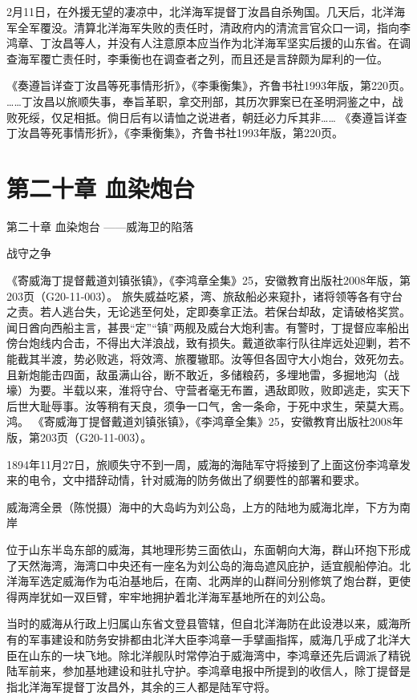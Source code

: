 \documentclass[12pt,UTF8]{ctexbook}
\begin{document}
2月11日，在外援无望的凄凉中，北洋海军提督丁汝昌自杀殉国。几天后，北洋海军全军覆没。清算北洋海军失败的责任时，清政府内的清流言官众口一词，指向李鸿章、丁汝昌等人，并没有人注意原本应当作为北洋海军坚实后援的山东省。在调查海军覆亡责任时，李秉衡也在调查者之列，而且还是言辞颇为犀利的一位。

《奏遵旨详查丁汝昌等死事情形折》，《李秉衡集》，齐鲁书社1993年版，第220页。
……丁汝昌以旅顺失事，奉旨革职，拿交刑部，其历次罪案已在圣明洞鉴之中，战败死绥，仅足相抵。倘日后有以请恤之说进者，朝廷必力斥其非…… 《奏遵旨详查丁汝昌等死事情形折》，《李秉衡集》，齐鲁书社1993年版，第220页。

\chapter{第二十章 血染炮台}
第二十章
血染炮台
——威海卫的陷落

战守之争

《寄威海丁提督戴道刘镇张镇》，《李鸿章全集》25，安徽教育出版社2008年版，第203页（G20-11-003）。
旅失威益吃紧，湾、旅敌船必来窥扑，诸将领等各有守台之责。若人逃台失，无论逃至何处，定即奏拿正法。若保台却敌，定请破格奖赏。闻日酋向西船主言，甚畏“定”“镇”两舰及威台大炮利害。有警时，丁提督应率船出傍台炮线内合击，不得出大洋浪战，致有损失。戴道欲率行队往岸远处迎剿，若不能截其半渡，势必败逃，将效湾、旅覆辙耶。汝等但各固守大小炮台，效死勿去。且新炮能击四面，敌虽满山谷，断不敢近，多储粮药，多埋地雷，多掘地沟（战壕）为要。半载以来，淮将守台、守营者毫无布置，遇敌即败，败即逃走，实天下后世大耻辱事。汝等稍有天良，须争一口气，舍一条命，于死中求生，荣莫大焉。鸿。 《寄威海丁提督戴道刘镇张镇》，《李鸿章全集》25，安徽教育出版社2008年版，第203页（G20-11-003）。

1894年11月27日，旅顺失守不到一周，威海的海陆军守将接到了上面这份李鸿章发来的电令，文中措辞动情，针对威海的防务做出了纲要性的部署和要求。


威海湾全景（陈悦摄）海中的大岛屿为刘公岛，上方的陆地为威海北岸，下方为南岸

位于山东半岛东部的威海，其地理形势三面依山，东面朝向大海，群山环抱下形成了天然海湾，海湾口中央还有一座名为刘公岛的海岛遮风庇护，适宜舰船停泊。北洋海军选定威海作为屯泊基地后，在南、北两岸的山群间分别修筑了炮台群，更使得两岸犹如一双巨臂，牢牢地拥护着北洋海军基地所在的刘公岛。

当时的威海从行政上归属山东省文登县管辖，但自北洋海防在此设港以来，威海所有的军事建设和防务安排都由北洋大臣李鸿章一手擘画指挥，威海几乎成了北洋大臣在山东的一块飞地。除北洋舰队时常停泊于威海湾中，李鸿章还先后调派了精锐陆军前来，参加基地建设和驻扎守护。李鸿章电报中所提到的收信人，除丁提督是指北洋海军提督丁汝昌外，其余的三人都是陆军守将。
\end{document}
